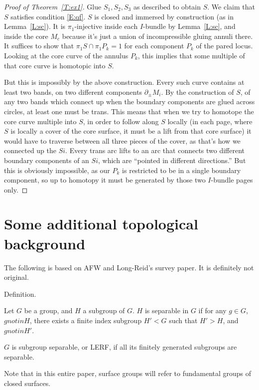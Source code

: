 \documentclass[12pt]{amsart}
\theoremstyle{definition}
\theoremstyle{remark}
\newcommand{\bd}{\partial}
\begin{document}
\begin{proof}[Proof of Theorem~\ref{T:ex1}]
Glue $S_1,S_2,S_3$ as described to obtain $S$. We claim that $S$ satisfies
condition \eqref{E:qf}. $S$ is closed and immersed by construction (as in
Lemma~\ref{L:sc}). It is $\pi_1$-injective inside each $I$-bundle by
Lemma~\ref{L:sc}, and inside the core $M_c$ because it's just a union of
incompressible gluing annuli there. It suffices to show that $\pi_1S \cap
\pi_1P_k = 1$ for each component $P_k$ of the pared locus. Looking at the core
curve of the annulus $P_k$, this implies that some multiple of that core curve
is homotopic into $S$.

But this is impossibly by the above construction. Every such curve contains at
least two bands, on two different components $\bd_\pm M_i$. By the construction
of $S$, of any two bands which connect up when the boundary components are
glued across circles, at least one must be trans. This means that when we try
to homotope the core curve multiple into $S$, in order to follow along $S$
locally (in each page, where $S$ is locally a cover of the core surface, it
must be a lift from that core surface) it would have to traverse between all
three pieces of the cover, as that's how we connected up the $Si$. Every trans
arc lifts to an arc that connects two different boundary components of an $Si$,
which are ``pointed in different directions.'' But this is obviously
impossible, as our $P_k$ is restricted to be in a single boundary component, so
up to homotopy it must be generated by those two $I$-bundle pages only.

\end{proof}

\section{Some additional topological background}

The following is based on AFW and Long-Reid's survey paper. It is definitely
not original.

Definition.

Let $G$ be a group, and $H$ a subgroup of $G$. $H$ is separable in $G$ if for
any $g \in G$, $g notin H$, there exists a finite index subgroup $H'<G$ such
that $H'>H$, and $g notin H'$.

$G$ is subgroup separable, or LERF, if all its finitely generated subgroups are
separable.

Note that in this entire paper, surface groups will refer to fundamental groups
of closed surfaces.
\end{document}
